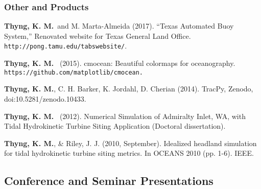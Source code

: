 \documentclass[10pt,letterpaper]{article}
\newcommand{\tkm}{\textbf{Thyng, K. M.}}
\renewenvironment{itemize}{
  \begin{list}{}{
    \setlength{\leftmargin}{1.5em}
    \setlength{\itemsep}{0.25em}
    \setlength{\parskip}{0pt}
    \setlength{\parsep}{0.25em}
  }
}{
  \end{list}
}
\begin{document}
\subsubsection*{Other and Products}

\begin{itemize}

\item \tkm~and M. Marta-Almeida (2017). ``Texas Automated Buoy System,'' Renovated website for Texas General Land Office. \verb+http://pong.tamu.edu/tabswebsite/+.

\item \tkm~ (2015). cmocean: Beautiful colormaps for oceanography. \\ \verb+https://github.com/matplotlib/cmocean.+

\item \tkm, C. H. Barker, K. Jordahl, D. Cherian (2014). TracPy, Zenodo, doi:10.5281/zenodo.10433.

\item \tkm~ (2012). Numerical Simulation of Admiralty Inlet, WA, with Tidal Hydrokinetic Turbine Siting Application (Doctoral dissertation).

\item \tkm, \& Riley, J. J. (2010, September). Idealized headland simulation for tidal hydrokinetic turbine siting metrics. In OCEANS 2010 (pp. 1-6). IEEE.

\end{itemize}

\subsection*{Conference and Seminar Presentations}
\end{document}
